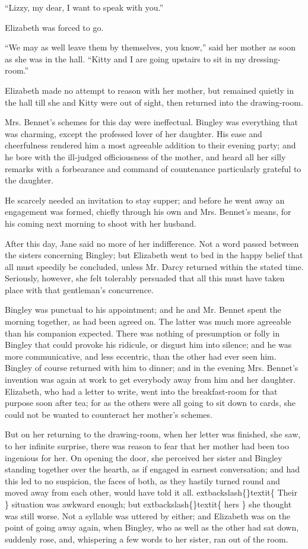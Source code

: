 \documentclass[10pt]{book}
\begin{document}
   “Lizzy, my dear, I want to speak with you.”
  

   Elizabeth was forced to go.
  

   “We may as well leave them by themselves, you know,” said her mother as
soon as she was in the hall. “Kitty and I are going upstairs to sit in
my dressing-room.”
  

   Elizabeth made no attempt to reason with her mother, but remained
quietly in the hall till she and Kitty were out of sight, then returned
into the drawing-room.
  

   Mrs. Bennet’s schemes for this day were ineffectual. Bingley was
everything that was charming, except the professed lover of her
daughter. His ease and cheerfulness rendered him a most agreeable
addition to their evening party; and he bore with the ill-judged
officiousness of the mother, and heard all her silly remarks with a
forbearance and command of countenance particularly grateful to the
daughter.
  

   He scarcely needed an invitation to stay supper; and before he went away
an engagement was formed, chiefly through his own and Mrs. Bennet’s
means, for his coming next morning to shoot with her husband.
  

   After this day, Jane said no more of her indifference. Not a word passed
between the sisters concerning Bingley; but Elizabeth went to bed in the
happy belief that all must speedily be concluded, unless Mr. Darcy
returned within the stated time. Seriously, however, she felt tolerably
persuaded that all this must have taken place with that gentleman’s
concurrence.
  

   Bingley was punctual to his appointment; and he and Mr. Bennet spent the
morning together, as had been agreed on. The latter was much more
agreeable than his companion expected. There was nothing of presumption
or folly in Bingley that could provoke his ridicule, or disgust him into
silence; and he was more communicative, and less eccentric, than the
other had ever seen him. Bingley of course returned with him to dinner;
and in the evening Mrs. Bennet’s invention was again at work to get
everybody away from him and her daughter. Elizabeth, who had a letter to
write, went into the breakfast-room for that purpose soon after tea; for
as the others were all going to sit down to cards, she could not be
wanted to counteract her mother’s schemes.
  

   But on her returning to the drawing-room, when her letter was finished,
she saw, to her infinite surprise, there was reason to fear that her
mother had been too ingenious for her. On opening the door, she
perceived her sister and Bingley standing together over the hearth, as
if engaged in earnest conversation; and had this led to no suspicion,
the faces of both, as they hastily turned round and moved away from each
other, would have told it all.
   	extbackslash\{\}textit\{
    Their
   \}
   situation was awkward enough; but
   	extbackslash\{\}textit\{
    hers
   \}
   she thought was still worse. Not a syllable was uttered by
either; and Elizabeth was on the point of going away again, when
Bingley, who as well as the other had sat
   down, suddenly rose, and,
whispering a few words to her sister, ran out of the room.
  
\end{document}
